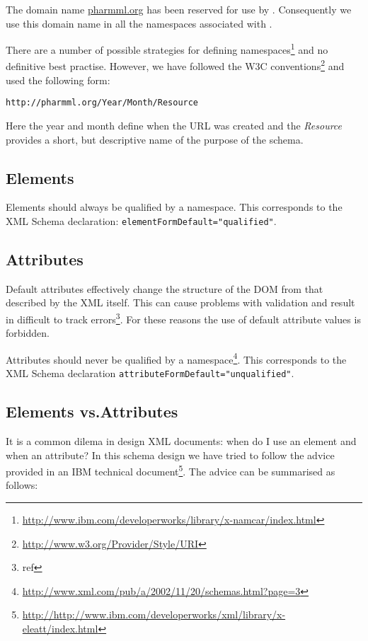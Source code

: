 The domain name \url{pharmml.org} has been reserved for use by
\pharmml. Consequently we use this domain name in all the namespaces
associated with \pharmml.

There are a number of possible strategies for defining
namespaces\footnote{\url{http://www.ibm.com/developerworks/library/x-namcar/index.html}}
and no definitive best practise. However, we have followed the W3C
conventions\footnote{\url{http://www.w3.org/Provider/Style/URI}} and
used the following form:
\begin{verbatim}
http://pharmml.org/Year/Month/Resource
\end{verbatim}
Here the year and month define when the URL was created and the
\emph{Resource} provides a short, but descriptive name of the purpose
of the schema.

\subsection{Elements}

Elements should always be qualified by a namespace. This corresponds
to the XML Schema declaration: \verb|elementFormDefault="qualified"|.

\subsection{Attributes}

Default attributes effectively change the structure of the DOM from
that described by the XML itself. This can cause problems with
validation and result in difficult to track
errors\footnote{ref}. For these reasons the use of default attribute
values is forbidden.

Attributes should never be qualified by a
namespace\footnote{\url{http://www.xml.com/pub/a/2002/11/20/schemas.html?page=3}}. This
corresponds to the XML Schema declaration
\verb|attributeFormDefault="unqualified"|.

\subsection{Elements vs.\@ Attributes}

It is a common dilema in design XML documents: when do I use an
element and when an attribute? In this schema design we have tried to
follow the advice provided in an IBM technical
document\footnote{\url{http://http://www.ibm.com/developerworks/xml/library/x-eleatt/index.html}}. The
advice can be summarised as follows:

